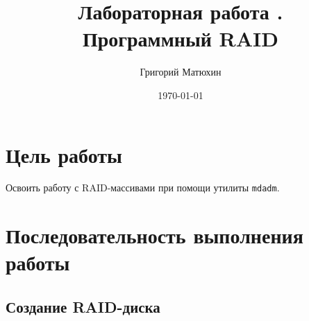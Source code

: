 \documentclass[12pt]{article}
\author{Григорий Матюхин}
\date{\today}
\title{Лабораторная работа \textnumero16.\\Программный RAID}
\begin{document}
\maketitle
\newpage
\tableofcontents
\newpage
\section{Цель работы}
Освоить работу с RAID-массивами при помощи утилиты \texttt{mdadm}.

\section{Последовательность выполнения работы}
\subsection{Создание RAID-диска}
\end{document}
